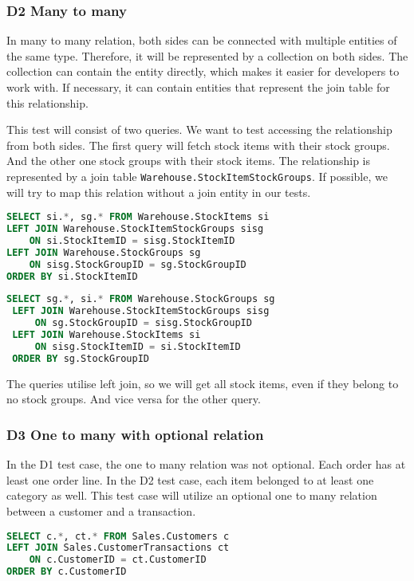 \subsubsection*{D2 Many to many}
In many to many relation, both sides can be connected with multiple entities of the same type. Therefore, it will be represented by a collection on both sides. The collection can contain the entity directly, which makes it easier for developers to work with. If necessary, it can contain entities that represent the join table for this relationship.

This test will consist of two queries. We want to test accessing the relationship from both sides. The first query will fetch stock items with their stock groups. And the other one stock groups with their stock items.
The relationship is represented by a join table \texttt{Warehouse.StockItemStockGroups}. If possible, we will try to map this relation without a join entity in our tests.

\begin{lstlisting}[language=SQL]
SELECT si.*, sg.* FROM Warehouse.StockItems si
LEFT JOIN Warehouse.StockItemStockGroups sisg
    ON si.StockItemID = sisg.StockItemID
LEFT JOIN Warehouse.StockGroups sg
    ON sisg.StockGroupID = sg.StockGroupID
ORDER BY si.StockItemID
\end{lstlisting}
\begin{lstlisting}[language=SQL]
 SELECT sg.*, si.* FROM Warehouse.StockGroups sg
 LEFT JOIN Warehouse.StockItemStockGroups sisg
     ON sg.StockGroupID = sisg.StockGroupID
 LEFT JOIN Warehouse.StockItems si
     ON sisg.StockItemID = si.StockItemID
 ORDER BY sg.StockGroupID
\end{lstlisting}
The queries utilise left join, so we will get all stock items, even if they belong to no stock groups. And vice versa for the other query.

\subsubsection*{D3 One to many with optional relation}
In the D1 test case, the one to many relation was not optional. Each order has at least one order line. In the D2 test case, each item belonged to at least one category as well.
This test case will utilize an optional one to many relation between a customer and a transaction. 

\begin{lstlisting}[language=SQL]
SELECT c.*, ct.* FROM Sales.Customers c
LEFT JOIN Sales.CustomerTransactions ct
    ON c.CustomerID = ct.CustomerID
ORDER BY c.CustomerID
\end{lstlisting}

